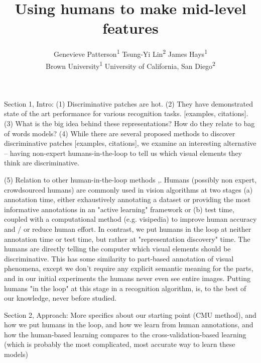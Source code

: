 \documentclass[10pt,twocolumn,letterpaper]{article}
\begin{document}
\title{Using humans to make mid-level features}

\author{Genevieve Patterson\textsuperscript{1} \quad Tsung-Yi Lin\textsuperscript{2} \quad James Hays\textsuperscript{1}\\
 Brown University\textsuperscript{1} \quad University of California, San Diego\textsuperscript{2}}

\maketitle

\begin{abstract}

\end{abstract}

Section 1, Intro:
(1) Discriminative patches are hot. \cite{singh2012unsupervised, doersch2012makes, juneja13blocks}
(2) They have demonstrated state of the art performance for various recognition tasks. [examples, citations].
(3) What is the big idea behind these representations? How do they relate to bag of words models?
(4) While there are several proposed methods to discover discriminative patches [examples, citations], we examine an interesting alternative -- having non-expert humans-in-the-loop to tell us which visual elements they think are discriminative. 

(5) Relation to other human-in-the-loop methods \cite{gingold2012micro, branson2010visual, kovashka2012whittlesearch},. Humans (possibly non expert, crowdsourced humans) are commonly used in vision algorithms at two stages (a) annotation time, either exhaustively annotating a dataset or providing the most informative annotations in an "active learning" framework or (b) test time, coupled with a computational method (e.g. visipedia) to improve human accuracy and / or reduce human effort. In contrast, we put humans in the loop at neither annotation time or test time, but rather at "representation discovery" time. The humans are directly telling the computer which visual elements should be discriminative. This has some similarity to part-based annotation of visual phenomena, except we don't require any explicit semantic meaning for the parts, and in our initial experiments the humans never even see entire images. Putting humans "in the loop" at this stage in a recognition algorithm, is, to the best of our knowledge, never before studied.

Section 2, Approach:
More specifics about our starting point (CMU method), and how we put humans in the loop, and how we learn from human annotations, and how the human-based learning compares to the cross-validation-based learning (which is probably the most complicated, most accurate way to learn these models)
\end{document}
